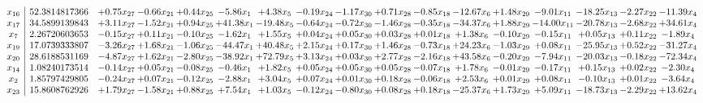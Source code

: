 \documentclass[9pt]{article}
\begin{document}
 \[\begin{array}{c| c c@{\hskip 2pt} c@{\hskip 2pt} c@{\hskip 2pt} c@{\hskip 2pt} c@{\hskip 2pt} c@{\hskip 2pt} c@{\hskip 2pt} c@{\hskip 2pt} c@{\hskip 2pt} c@{\hskip 2pt} c@{\hskip 2pt} c@{\hskip 2pt} c@{\hskip 2pt} c@{\hskip 2pt} c@{\hskip 2pt} }
 x_{16}   &  52.3814817366 & +  0.75 x_{27} & -0.66 x_{21} & +  0.44 x_{25} & -5.86 x_{1} & +  4.38 x_{5} & -0.19 x_{24} & -1.17 x_{30} & +  0.71 x_{28} & -0.85 x_{18} & -12.67 x_{6} & +  1.48 x_{29} & -9.01 x_{11} & -18.25 x_{13} & -2.27 x_{22} & -11.39 x_{4}\\
 x_{17}   &  34.5899139843 & +  3.11 x_{27} & -1.52 x_{21} & +  0.94 x_{25} & + 41.38 x_{1} & -19.48 x_{5} & -0.64 x_{24} & -0.72 x_{30} & -1.46 x_{28} & -0.35 x_{18} & -34.37 x_{6} & +  1.88 x_{29} & -14.00 x_{11} & -20.78 x_{13} & -2.68 x_{22} & + 34.61 x_{4}\\
 x_{7}   &  2.26720603653 & -0.15 x_{27} & +  0.11 x_{21} & -0.10 x_{25} & -1.62 x_{1} & +  1.55 x_{5} & +  0.04 x_{24} & +  0.05 x_{30} & +  0.03 x_{28} & +  0.01 x_{18} & +  1.38 x_{6} & -0.10 x_{29} & -0.15 x_{11} & +  0.05 x_{13} & +  0.11 x_{22} & -1.89 x_{4}\\
 x_{19}   &  17.0739333807 & -3.26 x_{27} & +  1.68 x_{21} & -1.06 x_{25} & -44.47 x_{1} & + 40.48 x_{5} & +  2.15 x_{24} & +  0.17 x_{30} & +  1.46 x_{28} & -0.73 x_{18} & + 24.23 x_{6} & -1.03 x_{29} & +  0.08 x_{11} & -25.95 x_{13} & +  0.52 x_{22} & -31.27 x_{4}\\
 x_{20}   &  28.6188531169 & -4.87 x_{27} & +  1.62 x_{21} & -2.80 x_{25} & -38.92 x_{1} & + 72.79 x_{5} & +  3.13 x_{24} & +  0.03 x_{30} & +  2.77 x_{28} & -2.16 x_{18} & + 43.58 x_{6} & -0.20 x_{29} & -7.94 x_{11} & -20.03 x_{13} & -0.18 x_{22} & -72.34 x_{4}\\
 x_{14}   &  1.08240173514 & -0.14 x_{27} & +  0.05 x_{21} & -0.08 x_{25} & -0.46 x_{1} & +  1.82 x_{5} & +  0.05 x_{24} & +  0.05 x_{30} & +  0.05 x_{28} & -0.07 x_{18} & +  1.78 x_{6} & -0.01 x_{29} & -0.17 x_{11} & +  0.15 x_{13} & +  0.02 x_{22} & -2.30 x_{4}\\
 x_{2}   &  1.85797429805 & -0.24 x_{27} & +  0.07 x_{21} & -0.12 x_{25} & -2.88 x_{1} & +  3.04 x_{5} & +  0.07 x_{24} & +  0.01 x_{30} & +  0.18 x_{28} & -0.06 x_{18} & +  2.53 x_{6} & +  0.01 x_{29} & +  0.08 x_{11} & -0.10 x_{13} & +  0.01 x_{22} & -3.64 x_{4}\\
 x_{23}   &  15.8608762926 & +  1.79 x_{27} & -1.58 x_{21} & +  0.88 x_{25} & +  7.54 x_{1} & +  1.03 x_{5} & -0.12 x_{24} & -0.80 x_{30} & +  0.08 x_{28} & +  0.18 x_{18} & -25.37 x_{6} & +  1.73 x_{29} & +  5.09 x_{11} & -18.73 x_{13} & -2.29 x_{22} & + 13.62 x_{4}\\

\end{array}\]
\end{document}

